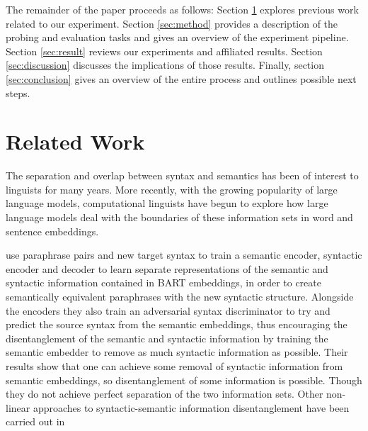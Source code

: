 \documentclass[11pt,a4paper]{article}
\begin{document}
The remainder of the paper proceeds as follows: Section \ref{sec:related} explores previous work related to our experiment. Section \ref{sec:method} provides a description of the probing and evaluation tasks and gives an overview of the experiment pipeline. Section \ref{sec:result} reviews our experiments and affiliated results. Section \ref{sec:discussion} discusses the implications of those results. Finally, section \ref{sec:conclusion} gives an overview of the entire process and outlines possible next steps. 



\section{Related Work}
\label{sec:related}



The separation and overlap between syntax and semantics has been of interest to linguists for many years. More recently, with the growing popularity of large language models, computational linguists have begun to explore how large language models deal with the boundaries of these information sets in word and sentence embeddings. 

\citealp{disentangle} use paraphrase pairs and new target syntax to train a semantic encoder, syntactic encoder and decoder to learn separate representations of the semantic and syntactic information contained in BART embeddings, in order to create semantically equivalent paraphrases with the new syntactic structure. Alongside the encoders they also train an adversarial syntax discriminator to try and predict the source syntax from the semantic embeddings, thus encouraging the disentanglement of the semantic and syntactic information by training the semantic embedder to remove as much syntactic information as possible. Their results show that one can achieve some removal of syntactic information from semantic embeddings, so disentanglement of some information is possible. Though they do not achieve perfect separation of the two information sets. Other non-linear approaches to syntactic-semantic information disentanglement have been carried out in \citealp{multiDis}

\end{document}
